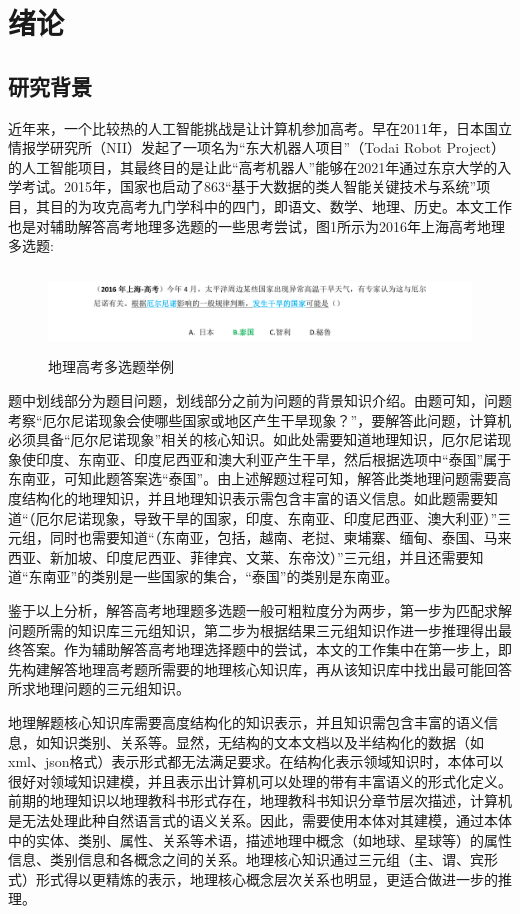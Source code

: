 \chapter{绪论}
\section{研究背景}
近年来，一个比较热的人工智能挑战是让计算机参加高考。早在2011年，日本国立情报学研究所（NII）发起了一项名为“东大机器人项目”（Todai Robot Project）的人工智能项目，其最终目的是让此“高考机器人”能够在2021年通过东京大学的入学考试\cite{Fujita}。2015年，国家也启动了863“基于大数据的类人智能关键技术与系统”项目，其目的为攻克高考九门学科中的四门，即语文、数学、地理、历史\cite{Cheng}。本文工作也是对辅助解答高考地理多选题的一些思考尝试，图1所示为2016年上海高考地理多选题:

\begin{figure}[!htb]
	\centering\includegraphics[height=2.2cm]{resource/ex_multi_choice_ques}
	\caption{地理高考多选题举例}
	\label{fig:ex_multi_choice_ques}
\end{figure}

题中划线部分为题目问题，划线部分之前为问题的背景知识介绍。由题可知，问题考察“厄尔尼诺现象会使哪些国家或地区产生干旱现象？”，要解答此问题，计算机必须具备“厄尔尼诺现象”相关的核心知识。如此处需要知道地理知识，厄尔尼诺现象使印度、东南亚、印度尼西亚和澳大利亚产生干旱，然后根据选项中“泰国”属于东南亚，可知此题答案选“泰国”。由上述解题过程可知，解答此类地理问题需要高度结构化的地理知识，并且地理知识表示需包含丰富的语义信息。如此题需要知道“（厄尔尼诺现象，导致干旱的国家，印度、东南亚、印度尼西亚、澳大利亚）”三元组，同时也需要知道“（东南亚，包括，越南、老挝、柬埔寨、缅甸、泰国、马来西亚、新加坡、印度尼西亚、菲律宾、文莱、东帝汶）”三元组，并且还需要知道“东南亚”的类别是一些国家的集合，“泰国”的类别是东南亚。

鉴于以上分析，解答高考地理题多选题一般可粗粒度分为两步，第一步为匹配求解问题所需的知识库三元组知识，第二步为根据结果三元组知识作进一步推理得出最终答案。作为辅助解答高考地理选择题中的尝试，本文的工作集中在第一步上，即先构建解答地理高考题所需要的地理核心知识库，再从该知识库中找出最可能回答所求地理问题的三元组知识。

地理解题核心知识库需要高度结构化的知识表示，并且知识需包含丰富的语义信息，如知识类别、关系等。显然，无结构的文本文档以及半结构化的数据（如xml、json格式）表示形式都无法满足要求。在结构化表示领域知识时，本体可以很好对领域知识建模，并且表示出计算机可以处理的带有丰富语义的形式化定义\cite{Hitzler}。前期的地理知识以地理教科书形式存在，地理教科书知识分章节层次描述，计算机是无法处理此种自然语言式的语义关系。因此，需要使用本体对其建模，通过本体中的实体、类别、属性、关系等术语，描述地理中概念（如地球、星球等）的属性信息、类别信息和各概念之间的关系。地理核心知识通过三元组（主、谓、宾形式）形式得以更精炼的表示，地理核心概念层次关系也明显，更适合做进一步的推理。

